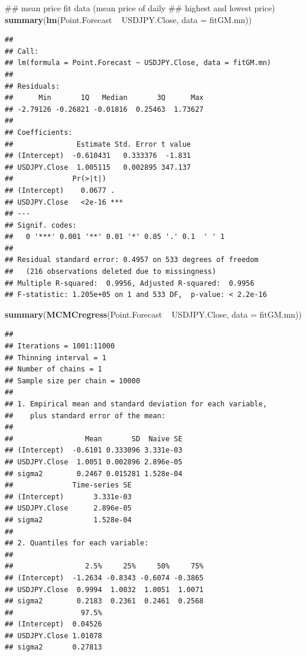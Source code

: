 \documentclass[]{tufte-book}
\newenvironment{Shaded}{}{}
\newcommand{\KeywordTok}[1]{\textcolor[rgb]{0.00,0.44,0.13}{\textbf{#1}}}
\newcommand{\DataTypeTok}[1]{\textcolor[rgb]{0.56,0.13,0.00}{#1}}
\newcommand{\StringTok}[1]{\textcolor[rgb]{0.25,0.44,0.63}{#1}}
\newcommand{\OperatorTok}[1]{\textcolor[rgb]{0.40,0.40,0.40}{#1}}
\newcommand{\NormalTok}[1]{#1}
\begin{document}
\begin{Shaded}
\begin{Highlighting}[]
\NormalTok{## mean price fit data (mean price of daily}
\NormalTok{## highest and lowest price)}
\KeywordTok{summary}\NormalTok{(}\KeywordTok{lm}\NormalTok{(Point.Forecast }\OperatorTok{~}\StringTok{ }\NormalTok{USDJPY.Close, }\DataTypeTok{data =}\NormalTok{ fitGM.mn))}
\end{Highlighting}
\end{Shaded}

\begin{verbatim}
## 
## Call:
## lm(formula = Point.Forecast ~ USDJPY.Close, data = fitGM.mn)
## 
## Residuals:
##      Min       1Q   Median       3Q      Max 
## -2.79126 -0.26821 -0.01816  0.25463  1.73627 
## 
## Coefficients:
##               Estimate Std. Error t value
## (Intercept)  -0.610431   0.333376  -1.831
## USDJPY.Close  1.005115   0.002895 347.137
##              Pr(>|t|)    
## (Intercept)    0.0677 .  
## USDJPY.Close   <2e-16 ***
## ---
## Signif. codes:  
##   0 '***' 0.001 '**' 0.01 '*' 0.05 '.' 0.1  ' ' 1
## 
## Residual standard error: 0.4957 on 533 degrees of freedom
##   (216 observations deleted due to missingness)
## Multiple R-squared:  0.9956, Adjusted R-squared:  0.9956 
## F-statistic: 1.205e+05 on 1 and 533 DF,  p-value: < 2.2e-16
\end{verbatim}

\begin{Shaded}
\begin{Highlighting}[]
\KeywordTok{summary}\NormalTok{(}\KeywordTok{MCMCregress}\NormalTok{(Point.Forecast }\OperatorTok{~}\StringTok{ }\NormalTok{USDJPY.Close, }
    \DataTypeTok{data =}\NormalTok{ fitGM.mn))}
\end{Highlighting}
\end{Shaded}

\begin{verbatim}
## 
## Iterations = 1001:11000
## Thinning interval = 1 
## Number of chains = 1 
## Sample size per chain = 10000 
## 
## 1. Empirical mean and standard deviation for each variable,
##    plus standard error of the mean:
## 
##                 Mean       SD  Naive SE
## (Intercept)  -0.6101 0.333096 3.331e-03
## USDJPY.Close  1.0051 0.002896 2.896e-05
## sigma2        0.2467 0.015281 1.528e-04
##              Time-series SE
## (Intercept)       3.331e-03
## USDJPY.Close      2.896e-05
## sigma2            1.528e-04
## 
## 2. Quantiles for each variable:
## 
##                 2.5%     25%     50%     75%
## (Intercept)  -1.2634 -0.8343 -0.6074 -0.3865
## USDJPY.Close  0.9994  1.0032  1.0051  1.0071
## sigma2        0.2183  0.2361  0.2461  0.2568
##                97.5%
## (Intercept)  0.04526
## USDJPY.Close 1.01078
## sigma2       0.27813
\end{verbatim}
\end{document}
